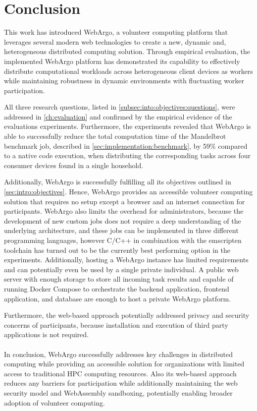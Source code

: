 \chapter{Conclusion}
\label{ch:conclusion}
This work has introduced WebArgo, a volunteer computing platform that leverages several modern web technologies to create a new, dynamic and, heterogeneous distributed computing solution. Through empirical evaluation, the implemented WebArgo platform has demonstrated its capability to effectively distribute computational workloads across heterogeneous client devices as workers while maintaining robustness in dynamic environments with fluctuating worker participation. 

All three research questions, listed in \autoref{subsec:into:objectives:questions}, were addressed in \autoref{ch:evaluation} and confirmed by the empirical evidence of the evaluations experiments. Furthermore, the experiments revealed that WebArgo is able to successfully reduce the total computation time of the Mandelbrot benchmark job, described in \autoref{sec:implementation:benchmark}, by 59\% compared to a native code execution, when distributing the corresponding tasks across four consumer devices found in a single household.

Additionally, WebArgo is successfully fulfilling all its objectives outlined in \autoref{sec:intro:objectives}. Hence, WebArgo provides an accessible volunteer computing solution that requires no setup except a browser and an internet connection for participants.  WebArgo also limits the overhead for administrators, because the development of new custom jobs does not require a deep understanding of the underlying architecture, and these jobs can be implemented in three different programming languages, however C/C++ in combination with the emscripten \cite{methodology:emcc} toolchain has turned out to be the currently best performing option in the experiments. Additionally, hosting a WebArgo instance has limited requirements and can potentially even be used by a single private individual. A public web server with enough storage to store all incoming task results and capable of running Docker Compose \cite{conclusion:docker} to orchestrate the backend application, frontend application, and database are enough to host a private WebArgo platform.

Furthermore, the web-based approach potentially addressed privacy and security concerns of participants, because installation and execution of third party applications is not required.
\\~\\
In conclusion, WebArgo successfully addresses key challenges in distributed computing while providing an accessible solution for organizations with limited access to traditional \ac{HPC} computing resources. Also its web-based approach reduces any barriers for participation while additionally maintaining the web security model and WebAssembly sandboxing, potentially enabling broader adoption of volunteer computing.


